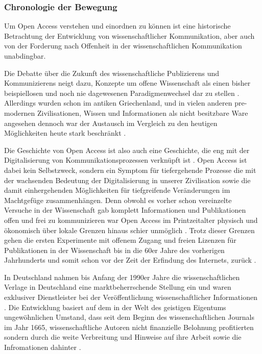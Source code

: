 \subsubsection{Chronologie der Bewegung}
Um Open Access verstehen und einordnen zu können ist eine historische Betrachtung der Entwicklung von wissenschaftlicher Kommunikation, aber auch von der Forderung nach Offenheit in der wissenschaftlichen Kommunikation unabdingbar. 

Die Debatte über die Zukunft des wissenschaftliche Publizierens und Kommunizierens neigt dazu, Konzepte um offene Wissenschaft als einen bisher beispiellosen und noch nie dagewesenen Paradigmenwechsel dar zu stellen \cite{cite:17a} \cite{cite:17b}. Allerdings wurden schon im antiken Griechenland, und in vielen anderen pre-modernen Zivilisationen, Wissen und Informationen als nicht besitzbare Ware angesehen\cite{cite:18} dennoch war der Austausch im Vergleich zu den heutigen Möglichkeiten heute stark beschränkt \cite{cite:17c}.

Die Geschichte von Open Access ist also auch eine Geschichte, die eng mit der Digitalisierung von Kommunikationsprozessen verknüpft ist \cite{albert_2006_open_implications}. Open Access ist dabei kein Selbstzweck\cite{cite:17d}, sondern ein Symptom für tiefergehende Prozesse die mit der wachsenden Bedeutung der Digitalisierung in unserer Zivilisation sowie die damit einhergehenden Möglichkeiten für tiefgreifende Veränderungen im Machtgefüge zusammenhängen\cite{cite:17e}. Denn obwohl es vorher schon vereinzelte Versuche in der Wissenschaft gab komplett Informationen und Publikationen offen und frei zu kommunizieren war Open Access im Printzeitalter physisch und ökonomisch über lokale Grenzen hinaus schier unmöglich \cite{cite:18a}. Trotz dieser Grenzen gehen die ersten Experimente mit offenem Zugang und freien Lizenzen für Publikationen in der Wissenschaft bis in die 60er Jahre des vorherigen Jahrhunderts und somit schon vor der Zeit der Erfindung des Internets, zurück \cite{cite:18b}. 

In Deutschland nahmen bis Anfang der 1990er Jahre die wissenschaftlichen Verlage in Deutschland eine marktbeherrschende Stellung ein und waren exklusiver Dienstleister bei der Veröffentlichung wissenschaftlicher Informationen \cite{schloegl_2005} \cite{offhaus_2012_institutionelle_repos}. Die Entwicklung basiert auf dem in der Welt des geistigen Eigentums ungewöhnlichen Umstand, dass seit dem Beginn des wissenschaftlichen Journals im Jahr 1665, wissenschaftliche Autoren nicht finanzielle Belohnung profitierten sondern durch die weite Verbreitung und Hinweise auf ihre Arbeit sowie die Infromationen dahinter \cite{albert_2006_open_implications}.

